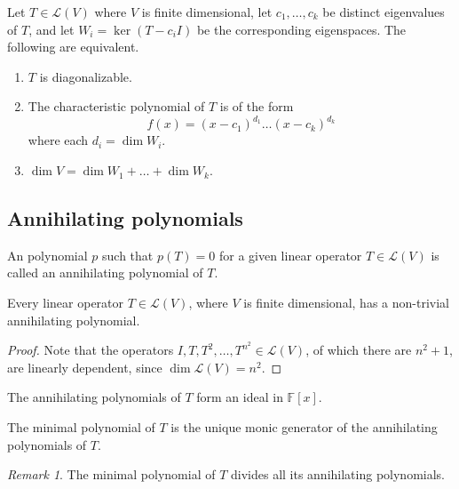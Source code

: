 \documentclass[11pt]{article}
\newcommand{\F}{\mathbb{F}}
\newcommand{\I}{I}
\newcommand{\alg}[1]{\mathscr{#1}}
\newcommand{\algL}{\alg{L}}
\renewcommand{\ker}{\operatorname{ker}}
\theoremstyle{definition}
\theoremstyle{remark}
\newtheorem*{remark}{Remark}
\numberwithin{equation}{section}
\begin{document}
    \begin{theorem}
        Let $T \in \algL(V)$ where $V$ is finite dimensional, let $c_1, \dots, c_k$
        be distinct eigenvalues of $T$, and let $W_i = \ker(T - c_iI)$ be the
        corresponding eigenspaces. The following are equivalent.
        \begin{enumerate}
            \itemsep0em
            \item $T$ is diagonalizable.
            \item The characteristic polynomial of $T$ is of the form \[
                f(x) = (x - c_1)^{d_1} \dots (x - c_k)^{d_k}
            \] where each $d_i = \dim{W_i}$.
            \item $\dim{V} = \dim{W_1} + \dots + \dim{W_k}$.
        \end{enumerate}
    \end{theorem}

    \subsection{Annihilating polynomials}
    
    \begin{definition}
        An polynomial $p$ such that $p(T) = 0$ for a given linear operator $T \in
        \algL(V)$ is called an annihilating polynomial of $T$.
    \end{definition}

    \begin{lemma}
        Every linear operator $T\in\algL(V)$, where $V$ is finite dimensional, has
        a non-trivial annihilating polynomial.
    \end{lemma}
    \begin{proof}
        Note that the operators $\I, T, T^2, \dots, T^{n^2} \in \algL(V)$, of
        which there are $n^2 + 1$, are linearly dependent, since $\dim{\algL(V)} =
        n^2$.
    \end{proof}

    \begin{lemma}
        The annihilating polynomials of $T$ form an ideal in $\F[x]$.
    \end{lemma}

    \begin{definition}
        The minimal polynomial of $T$ is the unique monic generator of the
        annihilating polynomials of $T$.
        \begin{remark}
            The minimal polynomial of $T$ divides all its annihilating polynomials.
        \end{remark}
    \end{definition}
\end{document}
